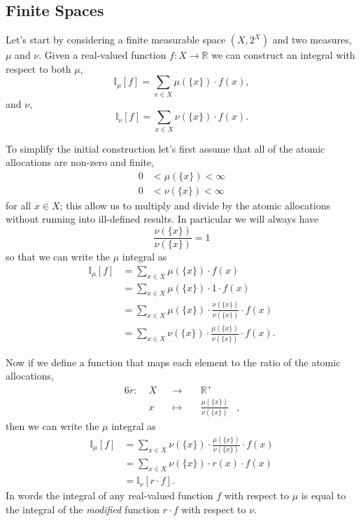 \documentclass[
  letterpaper,
  DIV=11,
  numbers=noendperiod]{scrartcl}
\begin{document}
\hypertarget{sec:finite_densities}{%
\subsection{Finite Spaces}\label{sec:finite_densities}}

Let's start by considering a finite measurable space \((X, 2^{X})\) and
two measures, \(\mu\) and \(\nu\). Given a real-valued function
\(f: X \rightarrow \mathbb{R}\) we can construct an integral with
respect to both \(\mu\), \[
\mathbb{I}_{\mu}[f] = \sum_{x \in X} \mu( \{ x \} ) \cdot f(x),
\] and \(\nu\), \[
\mathbb{I}_{\nu}[f] = \sum_{x \in X} \nu( \{ x \} ) \cdot f(x).
\]

To simplify the initial construction let's first assume that all of the
atomic allocations are non-zero and finite, \begin{align*}
0 &< \mu( \{ x \} ) < \infty
\\
0 &< \nu( \{ x \} ) < \infty
\end{align*} for all \(x \in X\); this allow us to multiply and divide
by the atomic allocations without running into ill-defined results. In
particular we will always have \[
\frac{ \nu( \{ x \} )}{ \nu( \{ x \} )} = 1
\] so that we can write the \(\mu\) integral as \begin{align*}
\mathbb{I}_{\mu}[f]
&=
\sum_{x \in X} \mu( \{ x \} ) \cdot f(x)
\\
&=
\sum_{x \in X} \mu( \{ x \} ) \cdot 1 \cdot f(x)
\\
&=
\sum_{x \in X} \mu( \{ x \} ) \cdot
\frac{ \nu( \{ x \} )}{ \nu( \{ x \} )} \cdot
f(x)
\\
&=
\sum_{x \in X} \nu( \{ x \} ) \cdot
\frac{ \mu( \{ x \} )}{ \nu( \{ x \} )} \cdot
f(x).
\end{align*}

Now if we define a function that maps each element to the ratio of the
atomic allocations, \begin{alignat*}{6}
r :\; & X & &\rightarrow& \; & \mathbb{R}^{+} &
\\
& x & &\mapsto& & \frac{ \mu( \{ x \} )}{ \nu( \{ x \} )} &,
\end{alignat*} then we can write the \(\mu\) integral as \begin{align*}
\mathbb{I}_{\mu}[f]
&=
\sum_{x \in X} \nu( \{ x \} ) \cdot
\frac{ \mu( \{ x \} )}{ \nu( \{ x \} )} \cdot f(x)
\\
&=
\sum_{x \in X} \nu( \{ x \} ) \cdot r(x) \cdot f(x)
\\
&=
\mathbb{I}_{\nu} [ r \cdot f ].
\end{align*} In words the integral of any real-valued function \(f\)
with respect to \(\mu\) is equal to the integral of the \emph{modified}
function \(r \cdot f\) with respect to \(\nu\).
\end{document}
